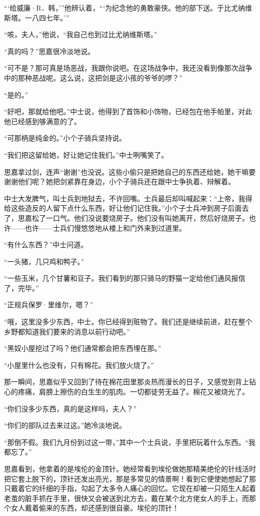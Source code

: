 \par “‘给威廉·R．韩，'”他辨认着，“‘为纪念他的勇敢豪侠。他的部下送。于比尤纳维斯塔。一八四七年。'”
\par “咳，夫人，”他说，“我自己也到过比尤纳维斯塔。”
\par “真的吗？”思嘉很冷淡地说。
\par “可不是？那可真是场恶战，我跟你说吧。在这场战争中，我还没看到像那次战争中的那种恶战呢。这么说，这把剑是这小孩的爷爷的啰？”
\par “是的。”
\par “好吧，那就给他吧。”中士说，他得到了首饰和小饰物，已经包在他手帕里，对此他已经感到够满意的了。
\par “可那柄是纯金的。”小个子骑兵坚持说。
\par “我们把这留给她，好让她记住我们。”中士咧嘴笑了。
\par 思嘉拿过剑，连声“谢谢”也没说。这些小偷只是把她自己的东西还给她，她干嘛要谢谢他们呢？她把剑紧靠在身边，小个子骑兵还在跟中士争执着、辩解着。
\par 中士大发脾气，叫士兵到地狱去，不许回嘴。士兵最后却叫喊起来：“上帝，我得给这些造反的人留下点什么东西，好让他们记住我。”小个子士兵冲到房子后面去了，思嘉松了一口气。他们没说要烧房子。他们没有叫她离开，然后好烧房子。也许——也许——士兵们慢悠悠地从楼上和门外来到过道里。
\par “有什么东西？”中士问道。
\par “一头猪，几只鸡和鸭子。”
\par “一些玉米，几个甘薯和豆子。我们看到的那只骑马的野猫一定给他们通风报信了，完毕。”
\par “正规兵保罗·里维尔，嗯？”
\par “哦，这里没多少东西，中士。你已经得到赃物了。我们还是继续前进，赶在整个乡野都知道我们要来的消息以前行动吧。”
\par “黑奴小屋挖过了吗？他们通常都会把东西埋在那。”
\par “小屋里什么也没有，只有棉花。我们放火烧了。”
\par 那一瞬间，思嘉似乎又回到了待在棉花田里那炎热而漫长的日子，又感觉到背上钻心的疼痛，肩膀上擦伤的白生生的肌肉。一切都徒劳无益了。棉花又被烧光了。
\par “你们没多少东西，真的是这样吗，夫人？”
\par “你们的部队过去来过这。”她冷淡地说。
\par “那倒不假。我们九月份到过这一带，”其中一个士兵说，手里把玩着什么东西。“我都忘了。”
\par 思嘉看到，他拿着的是埃伦的金顶针。她经常看到埃伦做她那精美绝伦的针线活时把它套上脱下的，顶针还发出亮光，那是多常见的情景啊！看到它便使她想起了那只戴着它的纤细的手指，勾起了太多令人痛心的回忆。它现在却被一只陌生人起着老茧的脏手抓在手里，很快又会被送到北方去，戴在某个北方佬女人的手上，而那个女人戴着偷来的东西，却还感到很自豪。埃伦的顶针！
